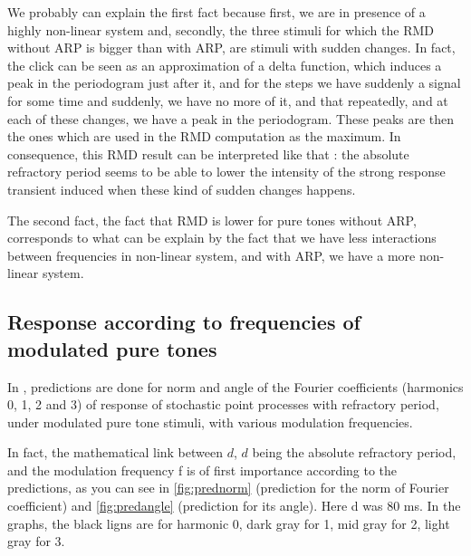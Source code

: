 We probably can explain the first fact because first, we are in presence of a highly 
non-linear system and, 
secondly, the three stimuli for which the RMD without ARP is bigger than with 
ARP, are stimuli with sudden changes. 
In fact, the click can be seen as an approximation of a delta function, 
which induces a peak in the periodogram just after it, 
and for the steps we have suddenly a signal for some time and suddenly, 
we have no more of it, and that repeatedly, and at each of these changes, 
we have a peak in the periodogram. 
These peaks are then the ones which are used in the RMD computation as the maximum.
In consequence, this RMD result can be interpreted like that : the absolute refractory period 
seems to be able to lower the intensity of the strong response transient induced 
when these kind of sudden changes happens.

The second fact, the fact that RMD is lower for pure tones without ARP, 
corresponds to what can be explain by the fact that we have less 
interactions between frequencies in non-linear system,
and with ARP, we have a more non-linear system.

\subsection{Response according to frequencies of modulated pure tones}

In \cite{Deger}, predictions are done for norm and angle of the Fourier coefficients 
(harmonics 0, 1, 2 and 3) of response of stochastic point processes with refractory period,
under modulated pure tone stimuli, with various modulation frequencies.

In fact, the mathematical link between $d$, $d$ being the absolute refractory period,
and the modulation frequency f is of first importance according to the predictions,
 as you can see in \autoref{fig:prednorm} (prediction for the norm of Fourier coefficient) and 
\autoref{fig:predangle} (prediction for its angle). Here d was 80 ms. 
In the graphs, the black ligns are for harmonic 0, dark gray for 1, mid gray for 2, light gray for 3.


